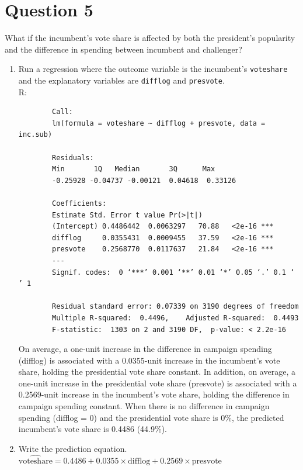 \documentclass[12pt,letterpaper]{article}
\begin{document}
\section*{Question 5}
\noindent What if the incumbent's vote share is affected by both the president's popularity and the difference in spending between incumbent and challenger? 
	\begin{enumerate}
		\item Run a regression where the outcome variable is the incumbent's \texttt{voteshare} and the explanatory variables are \texttt{difflog} and \texttt{presvote}.	\\
		
		R:
		
		\begin{verbatim}
		Call:
		lm(formula = voteshare ~ difflog + presvote, data = inc.sub)
		
		Residuals:
		Min       1Q   Median       3Q      Max 
		-0.25928 -0.04737 -0.00121  0.04618  0.33126 
		
		Coefficients:
		Estimate Std. Error t value Pr(>|t|)    
		(Intercept) 0.4486442  0.0063297   70.88   <2e-16 ***
		difflog     0.0355431  0.0009455   37.59   <2e-16 ***
		presvote    0.2568770  0.0117637   21.84   <2e-16 ***
		---
		Signif. codes:  0 ‘***’ 0.001 ‘**’ 0.01 ‘*’ 0.05 ‘.’ 0.1 ‘ ’ 1
		
		Residual standard error: 0.07339 on 3190 degrees of freedom
		Multiple R-squared:  0.4496,	Adjusted R-squared:  0.4493 
		F-statistic:  1303 on 2 and 3190 DF,  p-value: < 2.2e-16
		\end{verbatim}

		On average, a one-unit increase in the difference in campaign spending (difflog) is associated with a 0.0355-unit increase in the incumbent's vote share, holding the presidential vote share constant. In addition, on average, a one-unit increase in the presidential vote share (presvote) is associated with a 0.2569-unit increase in the incumbent's vote share, holding the difference in campaign spending constant.
		When there is no difference in campaign spending (difflog = 0) and the presidential vote share is 0\%, the predicted incumbent's vote share is 0.4486 (44.9\%).
		\vspace{.5cm}
		\item Write the prediction equation.\\
		
		$\widehat{\text{voteshare}} = 0.4486 + 0.0355 \times \text{difflog} + 0.2569 \times \text{presvote}$
		

\end{enumerate}
\end{document}
